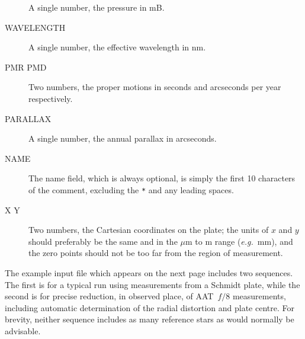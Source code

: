 \documentclass[twoside,11pt]{article}
\newcommand{\xlabel}[1]{}
\renewcommand{\_}{\texttt{\symbol{95}}}
\begin{document}
\begin{description}
A single number, the pressure in mB.

\goodbreak
\item[\xlabel{WAVELENGTH}WAVELENGTH]\mbox{}

A single number, the effective wavelength in nm.

\goodbreak
\item[\xlabel{PMR_PMD}PMR PMD]\mbox{}

Two numbers, the proper motions in seconds and arcseconds per year
respectively.

\goodbreak
\item[\xlabel{PARALLAX}PARALLAX]\mbox{}

A single number, the annual parallax in arcseconds.

\goodbreak
\item[\xlabel{NAME}NAME]\mbox{}

The name field, which is always optional, is simply the first 10
characters of the comment, excluding the \texttt{*} and any leading
spaces.

\goodbreak
\item[\xlabel{X_Y}X Y]\mbox{}

Two numbers, the Cartesian coordinates on the plate; the units of $x$
and $y$ should preferably be the same and in the $\mu$m to m range
(\emph{e.g.}\ mm), and the zero points should not be too far from the
region of measurement.

\end{description}

The example input file which appears on the next page includes two
sequences.  The first is for a typical run using measurements from a
Schmidt plate, while the second is for precise reduction, in observed
place, of AAT~$f/8$ measurements, including automatic determination of
the radial distortion and plate centre.  For brevity, neither sequence
includes as many reference stars as would normally be advisable.
\end{document}
